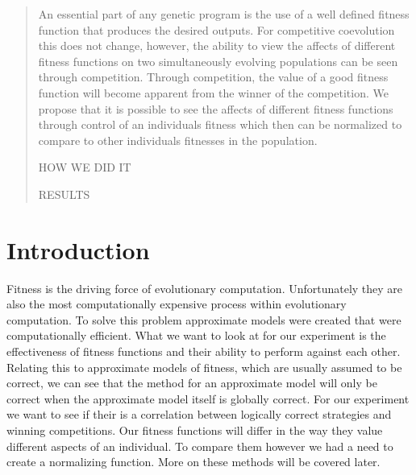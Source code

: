 \documentclass{acm_proc_article-sp}
\begin{document}

\maketitle
\begin{abstract}

An essential part of any genetic program is the use of a well defined fitness function that produces the desired outputs. For competitive coevolution this does not change, however, the ability to view the affects of different fitness functions on two simultaneously evolving populations can be seen through competition. Through competition, the value of a good fitness function will become apparent from the winner of the competition. We propose that it is possible to see the affects of different fitness functions through control of an individuals fitness which then can be normalized to compare to other individuals fitnesses in the population.

HOW WE DID IT

RESULTS

\end{abstract}




\section{Introduction} %

Fitness is the driving force of evolutionary computation. Unfortunately they are also the most computationally expensive process within evolutionary computation. To solve this problem approximate models were created that were computationally efficient\cite{Fitness}. What we want to look at for our experiment is the effectiveness of fitness functions and their ability to perform against each other. Relating this to approximate models of fitness, which are usually assumed to be correct\cite{Fitness}, we can see that the method for an approximate model will only be correct when the approximate model itself is globally correct. For our experiment we want to see if their is a correlation between logically correct strategies and winning competitions. Our fitness functions will differ in the way they value different aspects of an individual. To compare them however we had a need to create a normalizing function. More on these methods will be covered later. 
\end{document}
